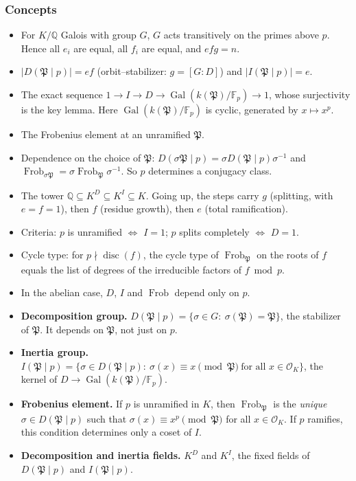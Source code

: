 \documentclass[11pt]{article}
\newcommand{\Q}{\mathbb{Q}}
\newcommand{\F}{\mathbb{F}}
\newcommand{\OK}{\mathcal{O}_K}
\newcommand{\fP}{\mathfrak{P}}
\DeclareMathOperator{\Gal}{Gal}
\DeclareMathOperator{\disc}{disc}
\DeclareMathOperator{\Frob}{Frob}
\begin{document}
\subsubsection*{Concepts}
\begin{itemize}
  \item For $K/\Q$ Galois with group $G$, $G$ acts transitively on the primes above $p$. Hence all $e_i$ are equal, all $f_i$ are equal, and $efg=n$.
  \item $|D(\fP\mid p)|=ef$ (orbit--stabilizer: $g=[G:D]$) and $|I(\fP\mid p)|=e$.
  \item The exact sequence $1\to I\to D\to\Gal(k(\fP)/\F_p)\to1$, whose surjectivity is the key lemma. Here $\Gal(k(\fP)/\F_p)$ is cyclic, generated by $x\mapsto x^p$.
  \item The Frobenius element at an unramified $\fP$.
  \item Dependence on the choice of $\fP$: $D(\sigma\fP\mid p)=\sigma D(\fP\mid p)\sigma^{-1}$ and $\Frob_{\sigma\fP}=\sigma\Frob_\fP\sigma^{-1}$. So $p$ determines a conjugacy class.
  \item The tower $\Q\subseteq K^D\subseteq K^I\subseteq K$. Going up, the steps carry $g$ (splitting, with $e=f=1$), then $f$ (residue growth), then $e$ (total ramification).
  \item Criteria: $p$ is unramified $\iff$ $I=1$; $p$ splits completely $\iff$ $D=1$.
  \item Cycle type: for $p\nmid\disc(f)$, the cycle type of $\Frob_\fP$ on the roots of $f$ equals the list of degrees of the irreducible factors of $f\bmod p$.
  \item In the abelian case, $D$, $I$ and $\Frob$ depend only on $p$.
\end{itemize}

\begin{keydefs}
\begin{itemize}
  \item \textbf{Decomposition group.} $D(\fP\mid p)=\{\sigma\in G:\ \sigma(\fP)=\fP\}$, the stabilizer of $\fP$. It depends on $\fP$, not just on $p$.
  \item \textbf{Inertia group.} $I(\fP\mid p)=\{\sigma\in D(\fP\mid p):\ \sigma(x)\equiv x \pmod{\fP}\ \text{for all } x\in\OK\}$, the kernel of $D\to\Gal(k(\fP)/\F_p)$.
  \item \textbf{Frobenius element.} If $p$ is unramified in $K$, then $\Frob_\fP$ is the \emph{unique} $\sigma\in D(\fP\mid p)$ such that $\sigma(x)\equiv x^p\pmod{\fP}$ for all $x\in\OK$. If $p$ ramifies, this condition determines only a coset of $I$.
  \item \textbf{Decomposition and inertia fields.} $K^D$ and $K^I$, the fixed fields of $D(\fP\mid p)$ and $I(\fP\mid p)$.
\end{itemize}
\end{keydefs}
\end{document}

